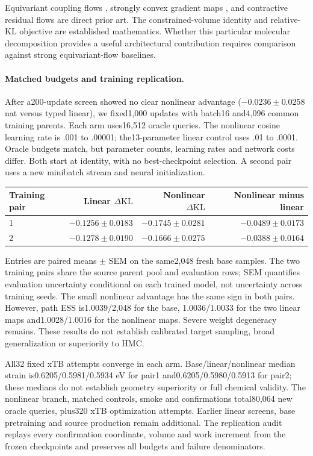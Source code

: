 Equivariant coupling flows \citep{midgley2023eacf,bose2021equivariantfinite},
strongly convex gradient maps \citep{huang2020convex}, and contractive residual
flows \citep{chen2019residual} are direct prior art. The constrained-volume
identity and relative-KL objective are established mathematics. Whether this
particular molecular decomposition provides a useful architectural contribution
requires comparison against strong equivariant-flow baselines.

\paragraph{Matched budgets and training replication.}
After a200-update screen showed no clear nonlinear advantage
($-0.0236\pm0.0258$ nat versus typed linear), we fixed1,000 updates with
batch16 and4,096 common training parents. Each arm uses16,512 oracle queries.
The nonlinear cosine learning rate is .001 to .00001; the13-parameter linear
control uses .01 to .0001. Oracle budgets match, but parameter counts, learning
rates and network costs differ. Both start at identity, with no best-checkpoint
selection. A second pair uses a new minibatch stream and neural initialization.

\begin{center}
\begin{tabular}{lrrr}
\toprule
Training pair & Linear $\Delta\mathrm{KL}$ & Nonlinear $\Delta\mathrm{KL}$ & Nonlinear minus linear\\
\midrule
1 & $-0.1256\pm0.0183$ & $-0.1745\pm0.0281$ & $-0.0489\pm0.0173$\\
2 & $-0.1278\pm0.0190$ & $-0.1666\pm0.0275$ & $-0.0388\pm0.0164$\\
\bottomrule
\end{tabular}
\end{center}

Entries are paired means $\pm$ SEM on the same2,048 fresh base samples.
The two training pairs share the source parent pool and evaluation rows;
SEM quantifies evaluation uncertainty conditional on each trained model,
not uncertainty across training seeds. The small nonlinear advantage has the
same sign in both pairs. However, path ESS is1.0039/2,048 for the base,
1.0036/1.0033 for the two linear maps and1.0028/1.0016 for the nonlinear maps.
Severe weight degeneracy remains. These results do not establish calibrated
target sampling, broad generalization or superiority to HMC.

All32 fixed xTB attempts converge in each arm. Base/linear/nonlinear median
strain is0.6205/0.5981/0.5934 eV for pair1 and0.6205/0.5980/0.5913 for pair2;
these medians do not establish geometry superiority or full chemical validity.
The nonlinear branch, matched controls, smoke and confirmations total80,064
new oracle queries, plus320 xTB optimization attempts. Earlier linear screens,
base pretraining and source production remain additional. The replication
audit replays every confirmation coordinate, volume and work increment from
the frozen checkpoints and preserves all budgets and failure denominators.

